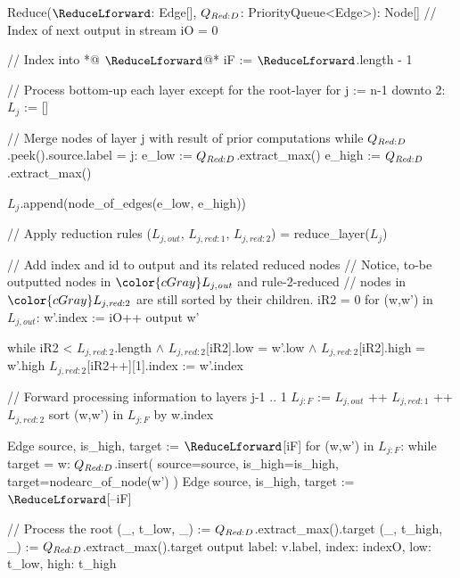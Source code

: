 \begin{blstlisting}
  Reduce($\ReduceLforward$: Edge[], $\ReduceQdep$: PriorityQueue<Edge>): Node[]
    // Index of next output in stream
    iO = 0

    // Index into *@\color{cGray} $\ReduceLforward$@*
    iF := $\ReduceLforward$.length - 1

    // Process bottom-up each layer except for the root-layer
    for j := n-1 downto 2:
      $L_{j}$ := []

      // Merge nodes of layer j with result of prior computations
      while $\ReduceQdep$.peek().source.label = j:
        e_low  := $\ReduceQdep$.extract_max()
        e_high := $\ReduceQdep$.extract_max()

        $L_{j}$.append(node_of_edges(e_low, e_high))

      // Apply reduction rules
      ($L_{j,\mathit{out}}$, $L_{j,\mathit{red:}1}$, $L_{j,\mathit{red:}2}$) = reduce_layer($L_{j}$)

      // Add index and id to output and its related reduced nodes
      //   Notice, to-be outputted nodes in $\color{cGray}L_{j,\mathit{out}}$ and rule-2-reduced
      //   nodes in $\color{cGray}L_{j,\mathit{red:}2}$ are still sorted by their children.
      iR2 = 0
      for (w,w') in $L_{j,\mathit{out}}$:
        w'.index := iO++
        output w'

        while iR2 < $L_{j,\mathit{red:}2}$.length $\land$ $L_{j,\mathit{red:}2}$[iR2].low = w'.low
                                 $\land$ $L_{j,\mathit{red:}2}$[iR2].high = w'.high
          $L_{j,\mathit{red:}2}$[iR2++][1].index := w'.index

      // Forward processing information to layers j-1 .. 1
      $L_{j:F}$ := $L_{j,\mathit{out}}$ ++ $L_{j,\mathit{red:}1}$ ++ $L_{j,\mathit{red:}2}$
      sort (w,w') in $L_{j:F}$ by w.index

      Edge{ source, is_high, target } := $\ReduceLforward$[iF]
      for (w,w') in $L_{j:F}$:
        while target = w:
          $\ReduceQdep$.insert({
            source=source,
            is_high=is_high,
            target=nodearc_of_node(w')
          })
          Edge{ source, is_high, target } := $\ReduceLforward$[--iF]

    // Process the root
    (_, t_low,  _) := $\ReduceQdep$.extract_max().target
    (_, t_high, _) := $\ReduceQdep$.extract_max().target
    output { label: v.label, index: indexO, low: t_low, high: t_high }
\end{blstlisting}
